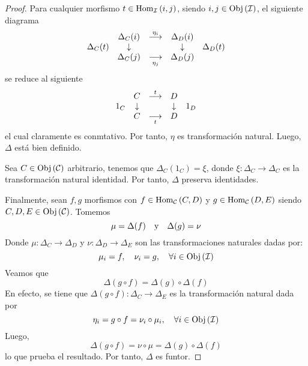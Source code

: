 \documentclass[12pt]{report}
\newcounter{it}
\theoremstyle{largebreak}
\newcommand\cf[3]{\ensuremath{#1:#2\rightarrow#3}}
\newcommand{\Obj}[1]{\ensuremath{\textup{Obj}\left(#1\right)}}
\newcommand{\Hom}[3]{\ensuremath{\textup{Hom}_{#1}\left(#2,#3\right)}}
\begin{document}
    \begin{proof}
        Para cualquier morfismo $t\in\Hom{\mathcal{I}}{i}{j}$, siendo $i,j\in\Obj{\mathcal{I}}$, el siguiente diagrama
        \begin{equation*}
            \begin{array}[pos]{rcccl}
                & \Delta_C(i) & \overset{\eta_i}{\longrightarrow} & \Delta_D(i) & \\
               \Delta_C(t) & \downarrow & & \downarrow & \Delta_D(t) \\
               & \Delta_C(j) & \underset{\eta_j}{\longrightarrow} & \Delta_D(j) & \\
            \end{array}
        \end{equation*}
        se reduce al siguiente
        \begin{equation*}
            \begin{array}[pos]{rcccl}
                & C & \overset{t}{\longrightarrow} & D & \\
               1_C & \downarrow & & \downarrow & 1_D \\
               & C & \underset{t}{\longrightarrow} & D & \\
            \end{array}
        \end{equation*}
        el cual claramente es conmtativo. Por tanto, $\eta$ es transformación natural. Luego, $\Delta$ está bien definido.

        Sea $C\in\Obj{\mathcal{C}}$ arbitrario, tenemos que $\Delta_C(1_C)=\xi$, donde $\cf{\xi}{\Delta_C}{\Delta_C}$ es la transformación natural identidad. Por tanto, $\Delta$ preserva identidades.

        Finalmente, sean $f,g$ morfismos con $f\in\Hom{\mathcal{C}}{C}{D}$ y $g\in\Hom{\mathcal{C}}{D}{E}$ siendo $C,D,E\in\Obj{\mathcal{C}}$. Tomemos
        \begin{equation*}
            \mu=\Delta(f)\quad\textup{y}\quad\Delta(g)=\nu
        \end{equation*}
        Donde $\cf{\mu}{\Delta_C}{\Delta_D}$ y $\cf{\nu}{\Delta_D}{\Delta_E}$ son las transformaciones naturales dadas por:
        \begin{equation*}
            \mu_i=f,\quad\nu_i=g,\quad\forall i\in\Obj{\mathcal{I}}
        \end{equation*}
        Veamos que
        \begin{equation*}
            \Delta(g\circ f)=\Delta(g)\circ\Delta(f)
        \end{equation*}
        En efecto, se tiene que $\cf{\Delta(g\circ f)}{\Delta_C}{\Delta_E}$ es la transformación natural dada por
        \begin{equation*}
            \eta_i=g\circ f=\nu_i\circ\mu_i,\quad\forall i\in\Obj{\mathcal{I}}
        \end{equation*}
        Luego,
        \begin{equation*}
            \Delta(g\circ f)=\nu\circ\mu=\Delta(g)\circ\Delta(f)
        \end{equation*}
        lo que prueba el resultado. Por tanto, $\Delta$ es funtor.
    \end{proof}
\end{document}
